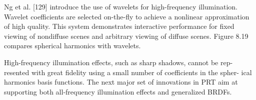 Ng et al. [129] introduce the use of wavelets for high-frequency illumination. Wavelet coefficients are selected on-the-fly to achieve a nonlinear approximation of high quality. This system demonstrates interactive performance for fixed viewing of nondiffuse scenes and arbitrary viewing of diffuse scenes. Figure 8.19 compares spherical harmonics with wavelets.

High-frequency illumination effects, such as sharp shadows, cannot be rep- resented with great fidelity using a small number of coefficients in the spher- ical harmonics basis functions. The next major set of innovations in PRT aim at supporting both all-frequency illumination effects and generalized BRDFs.
















